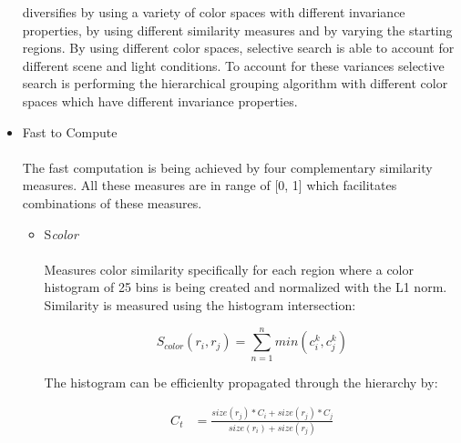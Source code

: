 \begin{itemize}
        diversifies by using a variety of color spaces with different invariance properties, by using different similarity measures and by
        varying the starting regions.  By using different color spaces, selective search is able to account for different scene and light
        conditions. To account for these variances selective search is performing the hierarchical grouping algorithm with different color
        spaces which have different invariance properties.
    \item Fast to Compute \\ \\
        The fast computation is being achieved by four complementary similarity measures. All these measures are in range of [0, 1] which
        facilitates combinations of these measures. \cite{selectivesearch}
        \begin{itemize}
            \item \large{S}\emph{color} \\ \\
                Measures color similarity specifically for each region where a color histogram of 25 bins is being created and normalized
                with the L1 norm. Similarity is measured using the histogram intersection: \cite{selectivesearch} \\
                \begin{center}
                    \begin{equation*}
                        S_{color}(r_i,r_j) = \sum_{n=1}^{n} min(c_i^{k},c_j^{k})
                    \end{equation*}\cite{selectivesearch}
                \end{center}
                \newpage
                \noindent
                The histogram can be efficienlty propagated through the hierarchy by: \\
                \begin{center}
                    \begin{equation*}
                        \begin{split}
                            C_t & = \frac{size(r_j)*C_i+size(r_j)*C_j}{size(r_i)+size(r_j)}
                        \end{split}
                    \end{equation*}\cite{selectivesearch}
                \end{center}


\end{itemize}
\end{itemize}
